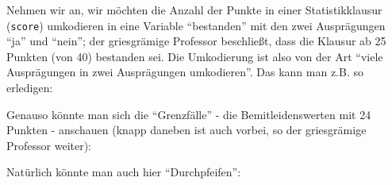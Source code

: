 \documentclass[12pt,ngerman,]{book}
\newenvironment{Shaded}{\begin{snugshade}}{\end{snugshade}}
\newcommand{\KeywordTok}[1]{\textcolor[rgb]{0.13,0.29,0.53}{\textbf{{#1}}}}
\newcommand{\DataTypeTok}[1]{\textcolor[rgb]{0.13,0.29,0.53}{{#1}}}
\newcommand{\DecValTok}[1]{\textcolor[rgb]{0.00,0.00,0.81}{{#1}}}
\newcommand{\StringTok}[1]{\textcolor[rgb]{0.31,0.60,0.02}{{#1}}}
\newcommand{\CommentTok}[1]{\textcolor[rgb]{0.56,0.35,0.01}{\textit{{#1}}}}
\newcommand{\NormalTok}[1]{{#1}}
\renewenvironment{Shaded}{\begin{kframe}}{\end{kframe}}
\begin{document}
Nehmen wir an, wir möchten die Anzahl der Punkte in einer
Statistikklausur (\texttt{score}) umkodieren in eine Variable
``bestanden'' mit den zwei Ausprägungen ``ja'' und ``nein''; der
griesgrämige Professor beschließt, dass die Klausur ab 25 Punkten (von
40) bestanden sei. Die Umkodierung ist also von der Art ``viele
Ausprägungen in zwei Ausprägungen umkodieren''. Das kann man z.B. so
erledigen:

\begin{Shaded}
\end{Shaded}

Genauso könnte man sich die ``Grenzfälle'' - die Bemitleidenswerten mit
24 Punkten - anschauen (knapp daneben ist auch vorbei, so der
griesgrämige Professor weiter):

\begin{Shaded}
\end{Shaded}

Natürlich könnte man auch hier ``Durchpfeifen'':

\begin{Shaded}
\end{Shaded}
\end{document}
